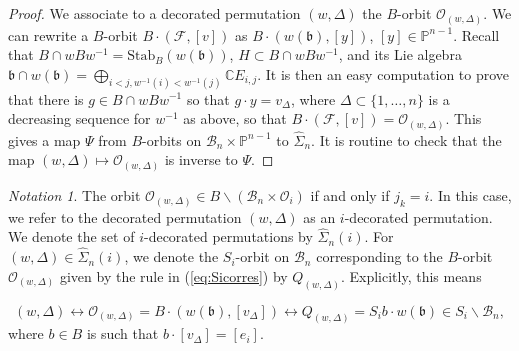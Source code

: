 \documentclass[12pt]{amsart}
\numberwithin{equation}{section}
\theoremstyle{remark}
\newtheorem{nota}[thm]{Notation}
\theoremstyle{definition}
\newtheorem{dfn-nota}[thm]{Definition-Notation}
\newcommand{\fb}{\mbox{${\mathfrak b}$}}
\newcommand{\C}{\mbox{${\mathbb C}$}}
\newcommand{\B}{\mathcal{B}}
\newcommand{\F}{\mathcal{F}}
\newcommand{\calO}{\mathcal{O}}
\begin{document}
\begin{proof}
We associate to a decorated permutation $(w, \Delta)$ the $B$-orbit ${{\mathcal O}}_{(w,\Delta)}.$  We can rewrite a $B$-orbit $B\cdot (\F, [v])$ as $B \cdot (w(\fb), [y])$, $[y]\in\mathbb{P}^{n-1}$.  Recall that $B \cap wBw^{-1}=\mbox{Stab}_{B} (w(\fb))$, $H\subset B \cap wBw^{-1}$, and its Lie algebra $\fb\cap w(\fb) = \bigoplus_{i<j,w^{-1}(i)<w^{-1}(j)}\C E_{i,j}.$   It is then an easy computation to prove that there is $g\in B\cap wBw^{-1}$  so that $g\cdot y=v_{\Delta}$, where $\Delta\subset\{1,\dots,n\}$ is a decreasing sequence for $w^{-1}$ as above, so that $B\cdot (\F, [v])= {{\mathcal O}}_{(w,\Delta)}.$   This gives a map $\Psi$ from $B$-orbits on $\B_{n} \times\mathbb{P}^{n-1}$ to $\widehat{\Sigma}_{n}.$   It is routine to check that the map $(w,\Delta) \mapsto {{\mathcal O}}_{(w,\Delta)}$ is inverse to $\Psi.$
\end{proof}




\begin{nota} \label{n:marked}  The orbit ${{\mathcal O}}_{(w,\Delta)}\in B\backslash(\B_{n}\times\mathcal{O}_{i})$ if and only if $j_{k}=i$.  In this case, we refer to the decorated permutation $(w,\Delta)$ as an $i$-decorated permutation.  We denote the set of $i$-decorated permutations by $\widehat{\Sigma}_{n}(i)$.  For $(w,\Delta)\in \widehat{\Sigma}_{n}(i)$, we denote the  $S_{i}$-orbit on $\B_{n}$ corresponding to the $B$-orbit $\mathcal{O}_{(w,\Delta)}$ given by the rule in (\ref{eq:Sicorres}) by $Q_{(w,\Delta)}$.  Explicitly, this means

\begin{equation}\label{eq:markedcorres}
(w,\Delta)\leftrightarrow \calO_{(w,\Delta)}=B\cdot (w(\fb), [v_{\Delta}])\leftrightarrow Q_{(w,\Delta)}= S_{i} b\cdot w(\fb) \in S_{i}\backslash\B_{n},
\end{equation}
where $b\in B$ is such that $b\cdot [v_{\Delta}]=[e_{i}]$.

\end{nota}
\end{document}
